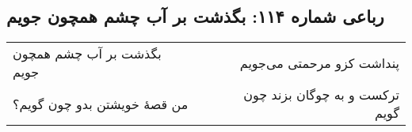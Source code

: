 \begin{center}
\section*{رباعی شماره ۱۱۴: بگذشت بر آب چشم همچون جویم}
\label{sec:114}
\begin{longtable}{l p{0.5cm} r}
بگذشت بر آب چشم همچون جویم
&&
پنداشت کزو مرحمتی می‌جویم
\\
من قصهٔ خویشتن بدو چون گویم؟
&&
ترکست و به چوگان بزند چون گویم
\\
\end{longtable}
\end{center}
